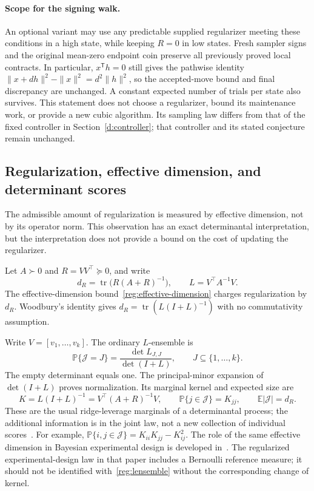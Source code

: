 \documentclass[11pt]{amsart}
\theoremstyle{definition}\newtheorem{definition}[theorem]{Definition}
\theoremstyle{remark}\newtheorem{remark}[theorem]{Remark}
\numberwithin{equation}{section}
\begin{document}
\paragraph{Scope for the signing walk.}
An optional variant may use any predictable supplied regularizer meeting
these conditions in a high state, while keeping $R=0$ in low states.
Fresh sampler signs and the original mean-zero endpoint coin preserve
all previously proved local contracts.  In particular, $x^{\mathsf T}h=0$
still gives the pathwise identity
$\|x+dh\|^2-\|x\|^2=d^2\|h\|^2$, so the accepted-move bound and final
discrepancy are unchanged.  A constant expected number of trials per
state also survives.  This statement does not choose a regularizer,
bound its maintenance work, or provide a new cubic algorithm.  Its
sampling law differs from that of the fixed controller in
Section~\ref{d:controller}; that controller and its stated conjecture
remain unchanged.

\subsection{Regularization, effective dimension, and determinant scores}
\label{reg:dpp}

The admissible amount of regularization is measured by effective dimension,
not by its operator norm.  This observation has an exact determinantal
interpretation, but the interpretation does not provide a bound on the cost
of updating the regularizer.

Let $A\succ0$ and $R=VV^\top\succeq0$, and write
\[
 d_R=\operatorname{tr}\bigl(R(A+R)^{-1}\bigr),\qquad
 L=V^\top A^{-1}V.
\]
The effective-dimension bound~\eqref{reg:effective-dimension} charges
regularization by $d_R$.  Woodbury's identity gives
$d_R=\operatorname{tr}(L(I+L)^{-1})$ with no commutativity assumption.

Write $V=[v_1,\ldots,v_k]$.  The ordinary $L$-ensemble is
\begin{equation}\label{reg:lensemble}
 \mathbb P\{\mathcal J=J\}=
 \frac{\det L_{J,J}}{\det(I+L)},\qquad J\subseteq\{1,\ldots,k\}.
\end{equation}
The empty determinant equals one.  The principal-minor expansion of
$\det(I+L)$ proves normalization.  Its marginal kernel and expected size
are
\begin{equation}\label{reg:marginal}
 K=L(I+L)^{-1}=V^\top(A+R)^{-1}V,\qquad
 \mathbb P\{j\in\mathcal J\}=K_{jj},\qquad
 \mathbb E|\mathcal J|=d_R.
\end{equation}
These are the usual ridge-leverage marginals of a determinantal process;
the additional information is in the joint law, not a new collection of
individual scores~\cite{DMdpp}.  For example,
$\mathbb P\{i,j\in\mathcal J\}=K_{ii}K_{jj}-K_{ij}^2$.
The role of the same effective dimension in Bayesian experimental design
is developed in~\cite{DLMdesign}.  The regularized experimental-design law
in that paper includes a Bernoulli reference measure; it should not be
identified with~\eqref{reg:lensemble} without the corresponding change of
kernel.
\end{document}
